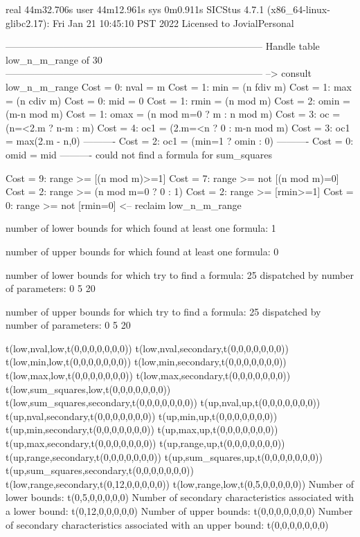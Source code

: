 real	44m32.706s
user	44m12.961s
sys	0m0.911s
SICStus 4.7.1 (x86_64-linux-glibc2.17): Fri Jan 21 10:45:10 PST 2022
Licensed to JovialPersonal


--------------------------------------------------------------------------------
Handle table low_n_m_range of 30
--------------------------------------------------------------------------------
--> consult low_n_m_range
Cost =  0:  nval        = m
Cost =  1:  min         = (n fdiv m)
Cost =  1:  max         = (n cdiv m)
Cost =  0:  mid         = 0
Cost =  1:  rmin        = (n mod m)
Cost =  2:  omin        = (m-n mod m)
Cost =  1:  omax        = (n mod m=0 ? m : n mod m)
Cost =  3:  oc          = (n=<2.m ? n-m : m)
Cost =  4:  oc1         = (2.m=<n ? 0 : m-n mod m)
Cost =  3:  oc1         = max(2.m - n,0)
----------
Cost =  2:  oc1         = (min=1 ? omin : 0)
----------
Cost =  0:  omid        = mid
----------
could not find a formula for sum_squares

Cost =  9:  range >= [(n mod m)>=1]
Cost =  7:  range >= not [(n mod m)=0]
Cost =  2:  range >= (n mod m=0 ? 0 : 1)
Cost =  2:  range >= [rmin>=1]
Cost =  0:  range >= not [rmin=0]
<-- reclaim low_n_m_range

number of lower bounds for which found at least one formula: 1

number of upper bounds for which found at least one formula: 0

number of lower bounds for which try to find a formula: 25
dispatched by number of parameters: 0  5  20

number of upper bounds for which try to find a formula: 25
dispatched by number of parameters: 0  5  20

t(low,nval,low,t(0,0,0,0,0,0,0))
t(low,nval,secondary,t(0,0,0,0,0,0,0))
t(low,min,low,t(0,0,0,0,0,0,0))
t(low,min,secondary,t(0,0,0,0,0,0,0))
t(low,max,low,t(0,0,0,0,0,0,0))
t(low,max,secondary,t(0,0,0,0,0,0,0))
t(low,sum_squares,low,t(0,0,0,0,0,0,0))
t(low,sum_squares,secondary,t(0,0,0,0,0,0,0))
t(up,nval,up,t(0,0,0,0,0,0,0))
t(up,nval,secondary,t(0,0,0,0,0,0,0))
t(up,min,up,t(0,0,0,0,0,0,0))
t(up,min,secondary,t(0,0,0,0,0,0,0))
t(up,max,up,t(0,0,0,0,0,0,0))
t(up,max,secondary,t(0,0,0,0,0,0,0))
t(up,range,up,t(0,0,0,0,0,0,0))
t(up,range,secondary,t(0,0,0,0,0,0,0))
t(up,sum_squares,up,t(0,0,0,0,0,0,0))
t(up,sum_squares,secondary,t(0,0,0,0,0,0,0))
t(low,range,secondary,t(0,12,0,0,0,0,0))
t(low,range,low,t(0,5,0,0,0,0,0))
Number of lower bounds:                                             t(0,5,0,0,0,0,0)
Number of secondary characteristics associated with a lower bound:  t(0,12,0,0,0,0,0)
Number of upper bounds:                                             t(0,0,0,0,0,0,0)
Number of secondary characteristics associated with an upper bound: t(0,0,0,0,0,0,0)

